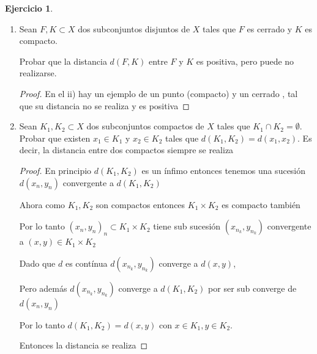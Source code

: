 \documentclass[11pt]{report}
\theoremstyle{definition}
\newtheorem{ej}{Ejercicio}
\begin{document}
\begin{ej}
\begin{enumerate}
			\item Sean $F,K \subset X$ dos subconjuntos disjuntos de $X$ tales que $F$ es cerrado y $K$ es compacto.

				Probar que la distancia $d(F,K)$ entre $F$ y $K$ es positiva, pero puede no realizarse.
				\begin{proof}
					En el ii) hay un ejemplo de un punto (compacto) y un cerrado , tal que su distancia no se realiza y es positiva
				\end{proof}
				
			\item Sean $K_1,K_2 \subset X$ dos subconjuntos compactos de $X$ tales que $K_1 \cap K_2 = \emptyset$. Probar que existen $x_1 \in K_1$ y $x_2 \in K_2$ tales que $d(K_1,K_2) = d(x_1,x_2)$. Es decir, la distancia entre dos compactos siempre se realiza

				\begin{proof}
					En principio $d(K_1,K_2)$ es un ínfimo entonces tenemos una sucesión $d(x_n,y_n)$ convergente a $d(K_1,K_2)$

					Ahora como $K_1,K_2$ son compactos entonces $K_1 \times K_2$ es compacto también

					Por lo tanto $(x_n,y_n)_n \subset K_1\times K_2 $ tiene sub sucesión $(x_{n_k},y_{n_k})$ convergente a $(x,y) \in K_1 \times K_2$

					Dado que $d$ es contínua $d(x_{n_k},y_{n_k})$ converge a $d(x,y)$, 

					Pero además $d(x_{n_k},y_{n_k})$ converge a $d(K_1,K_2)$ por ser sub converge de $d(x_n,y_n)$

					Por lo tanto  $d(K_1,K_2) = d(x,y)$ con $x\in K_1,y \in K_2$.

					Entonces la distancia se realiza
				\end{proof}
		\end{enumerate}
	\end{ej}
\end{document}
